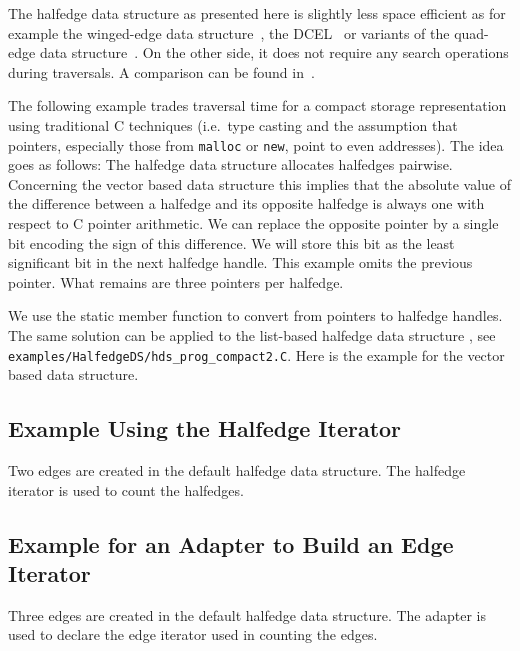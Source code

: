 \begin{ccAdvanced}
  
The halfedge data structure as presented here is slightly less space
efficient as for example the winged-edge data
structure~\cite{b-prcv-75}, the DCEL~\cite{mp-fitcp-78} or variants of
the quad-edge data structure~\cite{gs-pmgsc-85}.  On the other side,
it does not require any search operations during traversals. A
comparison can be found in~\cite{k-ugpdd-99}.

The following example trades traversal time for a compact storage
representation using traditional C techniques (i.e.~type casting and
the assumption that pointers, especially those from {\tt malloc} or
{\tt new}, point to even addresses). The idea goes as follows: The
halfedge data structure allocates halfedges pairwise.  Concerning the
vector based data structure this implies that the absolute value of
the difference between a halfedge and its opposite halfedge is always
one with respect to C pointer arithmetic. We can replace the opposite
pointer by a single bit encoding the sign of this difference.  We will
store this bit as the least significant bit in the next halfedge
handle.  This example omits the previous pointer. What remains are
three pointers per halfedge. 

We use the static member function  to convert
from pointers to halfedge handles. The same solution can be applied to
the list-based halfedge data structure ,
see \texttt{examples/HalfedgeDS/hds\_prog\_compact2.C}. Here is the
example for the vector based data structure.


\end{ccAdvanced}

\subsection{Example Using the Halfedge Iterator}

Two edges are created in the default halfedge data structure.
The halfedge iterator is used to count the halfedges.


\subsection{Example for an Adapter to Build an Edge Iterator}

Three edges are created in the default halfedge data structure.
The adapter  is used to declare the edge
iterator used in counting the edges.





